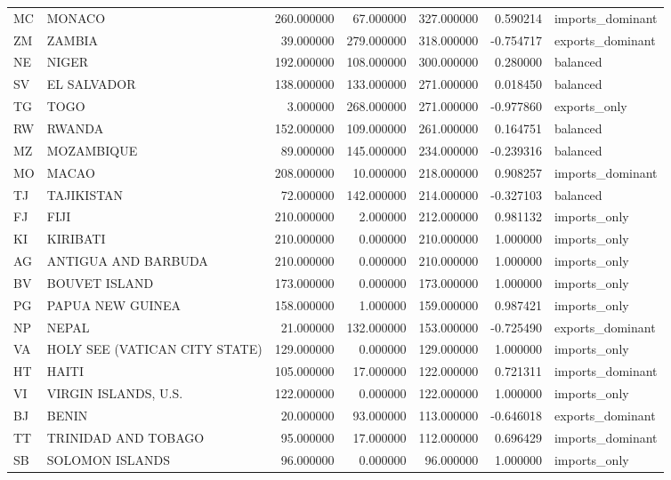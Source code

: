 \begin{tabular}{llrrrrl}
MC & MONACO & 260.000000 & 67.000000 & 327.000000 & 0.590214 & imports\_dominant \\
ZM & ZAMBIA & 39.000000 & 279.000000 & 318.000000 & -0.754717 & exports\_dominant \\
NE & NIGER & 192.000000 & 108.000000 & 300.000000 & 0.280000 & balanced \\
SV & EL SALVADOR & 138.000000 & 133.000000 & 271.000000 & 0.018450 & balanced \\
TG & TOGO & 3.000000 & 268.000000 & 271.000000 & -0.977860 & exports\_only \\
RW & RWANDA & 152.000000 & 109.000000 & 261.000000 & 0.164751 & balanced \\
MZ & MOZAMBIQUE & 89.000000 & 145.000000 & 234.000000 & -0.239316 & balanced \\
MO & MACAO & 208.000000 & 10.000000 & 218.000000 & 0.908257 & imports\_dominant \\
TJ & TAJIKISTAN & 72.000000 & 142.000000 & 214.000000 & -0.327103 & balanced \\
FJ & FIJI & 210.000000 & 2.000000 & 212.000000 & 0.981132 & imports\_only \\
KI & KIRIBATI & 210.000000 & 0.000000 & 210.000000 & 1.000000 & imports\_only \\
AG & ANTIGUA AND BARBUDA & 210.000000 & 0.000000 & 210.000000 & 1.000000 & imports\_only \\
BV & BOUVET ISLAND & 173.000000 & 0.000000 & 173.000000 & 1.000000 & imports\_only \\
PG & PAPUA NEW GUINEA & 158.000000 & 1.000000 & 159.000000 & 0.987421 & imports\_only \\
NP & NEPAL & 21.000000 & 132.000000 & 153.000000 & -0.725490 & exports\_dominant \\
VA & HOLY SEE (VATICAN CITY STATE) & 129.000000 & 0.000000 & 129.000000 & 1.000000 & imports\_only \\
HT & HAITI & 105.000000 & 17.000000 & 122.000000 & 0.721311 & imports\_dominant \\
VI & VIRGIN ISLANDS, U.S. & 122.000000 & 0.000000 & 122.000000 & 1.000000 & imports\_only \\
BJ & BENIN & 20.000000 & 93.000000 & 113.000000 & -0.646018 & exports\_dominant \\
TT & TRINIDAD AND TOBAGO & 95.000000 & 17.000000 & 112.000000 & 0.696429 & imports\_dominant \\
SB & SOLOMON ISLANDS & 96.000000 & 0.000000 & 96.000000 & 1.000000 & imports\_only \\

\end{tabular}
